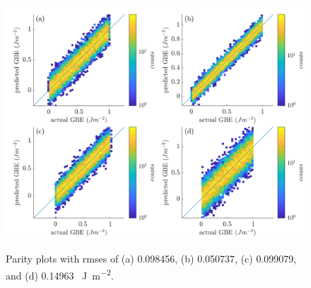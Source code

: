 \begin{figure}[h]
	\centering
	\includegraphics[scale=1]{figures/multi-parity.png}
	\label{fig:parity-test}
	\caption{Parity plots with \glspl{rmse} of (a) 0.098456, (b) 0.050737, (c) 0.099079,  and (d) 0.14963 \SI{}{\J\per\square\m}.}
\end{figure}
